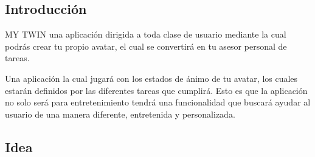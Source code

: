 \documentclass[10pt]{article}
\begin{document}
{{%
\newpage
\begin{flushleft}
\subsection{Introducci\'on}

\normalsize
MY TWIN una aplicaci\'on dirigida a toda clase de usuario mediante la cual podr\'as crear tu propio avatar, el cual se convertir\'a en tu asesor personal de tareas.

Una aplicaci\'on la cual jugar\'a con los estados de \'animo de tu avatar, los cuales estar\'an definidos por las diferentes tareas que cumplir\'a. Esto es que la aplicaci\'on no solo ser\'a para entretenimiento tendr\'a una funcionalidad que buscar\'a ayudar al usuario de una manera diferente, entretenida y personalizada.\\

\subsection{Idea}

\end{flushleft}}}
\end{document}

